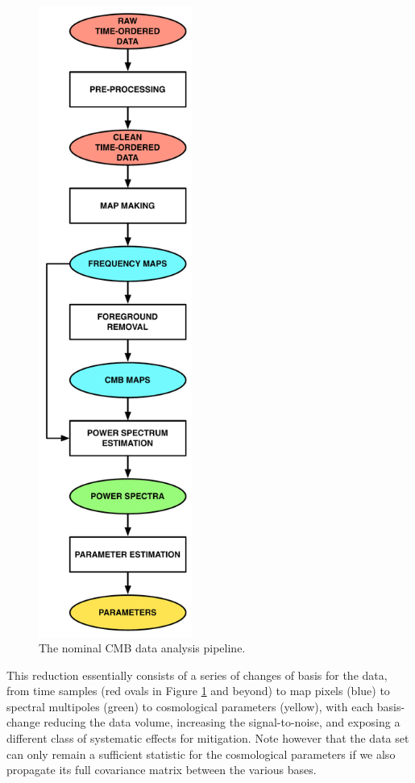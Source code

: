 \begin{figure}[htbp]
\begin{minipage}[h]{0.4\linewidth}
\begin{center}
\includegraphics[width=0.45\textwidth]{Analysis/nda}
\caption{The nominal CMB data analysis pipeline.}
\label{fig_nda}
\end{center}
\end{minipage}
\end{figure}

This reduction essentially consists of a series of changes of basis for the data, from time samples (red ovals in Figure \ref{fig_nda} and beyond) to map pixels (blue) to spectral multipoles (green) to cosmological parameters (yellow), with each basis-change reducing the data volume, increasing the signal-to-noise, and exposing a different class of systematic effects for mitigation. Note however that the data set can only remain a sufficient statistic for the cosmological parameters if we also propagate its full covariance matrix between the various bases. 

